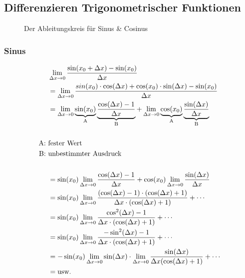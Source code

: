 \subsection{Differenzieren Trigonometrischer Funktionen}

\begin{figure}[H]
    \centering
    \caption{Der Ableitungskreis für Sinus \& Cosinus}
\end{figure}

\subsubsection{Sinus}

\begin{align*}
    & \lim_{\Delta x \rightarrow 0} \frac{\sin(x_0 + \Delta x) - \sin(x_0)}{\Delta x} \\
    &= \lim_{\Delta x \rightarrow 0} \frac{sin(x_0) \cdot \cos(\Delta x) + \cos(x_0) \cdot \sin(\Delta x) - \sin(x_0)}{\Delta x} \\
    &= \lim_{\Delta x \rightarrow 0} \underbrace{\sin(x_0)}_{\text{A}} \underbrace{\frac{\cos(\Delta x) - 1}{\Delta x}}_{\text{B}} +
    \lim_{\Delta x \rightarrow 0} \underbrace{\cos(x_0)}_{\text{A}} \underbrace{\frac{\sin(\Delta x)}{\Delta x}}_{\text{B}} \\
    \\
    \text{A: } & \text{fester Wert} \\
    \text{B: } & \text{unbestimmter Ausdruck} \\
    \\
    &= \sin(x_0) \lim_{\Delta x \rightarrow 0} \frac{\cos(\Delta x) - 1}{\Delta x} + \cos(x_0) \lim_{\Delta x \rightarrow 0} \frac{\sin(\Delta x)}{\Delta x} \\
    &= \sin(x_0) \lim_{\Delta x \rightarrow 0} \frac{(\cos(\Delta x) - 1) \cdot (\cos(\Delta x) + 1)}{\Delta x \cdot (\cos(\Delta x) + 1)} + \cdots \\
    &= \sin(x_0) \lim_{\Delta x \rightarrow 0} \frac{\cos^2(\Delta x) - 1}{\Delta x \cdot (\cos(\Delta x) + 1)} + \cdots \\
    &= \sin(x_0) \lim_{\Delta x \rightarrow 0} \frac{- \sin^2(\Delta x) - 1}{\Delta x \cdot (\cos(\Delta x) + 1)} + \cdots \\
    &= -\sin(x_0) \lim_{\Delta x \rightarrow 0} \sin(\Delta x) \cdot \lim_{\Delta x \rightarrow 0} \frac{\sin(\Delta x)}{\Delta x (\cos(\Delta x) + 1)} + \cdots \\
    &= \text{usw.}
\end{align*}

